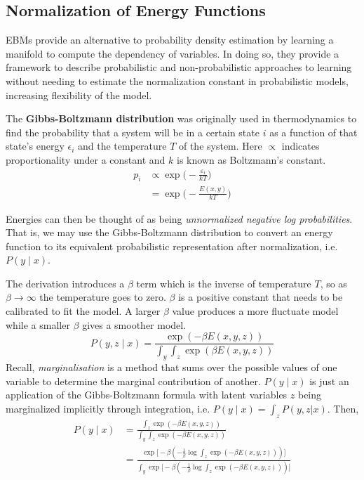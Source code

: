 \documentclass{article}
\begin{document}
\subsection{Normalization of Energy Functions}
EBMs provide an alternative to probability density estimation by learning a manifold to compute the dependency of variables. In doing so, they provide a framework to describe probabilistic and non-probabilistic approaches to learning without needing to estimate the normalization constant in probabilistic models, increasing flexibility of the model.

The \textbf{Gibbs-Boltzmann distribution} was originally used in thermodynamics to find the probability that a system will be in a certain state $i$ as a function of that state's energy $\epsilon_i$ and the temperature $T$ of the system. Here $\propto$ indicates proportionality under a constant and $k$ is known as Boltzmann's constant.  
\begin{align*}
    p_{i} &\propto \exp \bigg ( -{\frac {\varepsilon_{i}}{kT}} \bigg )\\
     &= \exp \bigg( - \frac{E(x, y)}{kT} \bigg )
\end{align*}

Energies can then be thought of as being \textit{unnormalized negative log probabilities}. That is, we may use the Gibbs-Boltzmann distribution to convert an energy function to its equivalent probabilistic representation after normalization, i.e. $P(y \mid x)$. 

The derivation introduces a $\beta$ term which is the inverse of temperature $T$, so as $\beta \rightarrow \infty$ the temperature goes to zero. $\beta$ is a positive constant that needs to be calibrated to fit the model. A larger $\beta$ value produces a more fluctuate model while a smaller $\beta$ gives a smoother model. 
\[
    P(y, z \mid x) = \frac{\exp(-\beta E(x,y,z)) }{ \int_y \int_z \exp(\beta E(x, y, z))} 
\]
Recall, \textit{marginalisation} is a method that sums over the possible values of one variable to determine the marginal contribution of another. $P(y \mid x)$ is just an application of the Gibbs-Boltzmann formula with latent variables $z$ being marginalized implicitly through integration, i.e. $P(y \mid x) = \int_z P(y,z | x)$. Then,
\begin{align*}
    P(y \mid x) &= \frac{ \int_z \exp(-\beta E(x,y,z)) }{ \int_y \int_z \exp(-\beta E(x, y, z))} \\
    &= \frac{
        \exp \bigg [  -\beta (-\frac{1}{\beta} \log  \int_z \exp(-\beta E(x,y,z)) ) \bigg ]
    }{
        \int_y \exp \bigg [  -\beta (-\frac{1}{\beta} \log  \int_z \exp(-\beta E(x,y,z)) ) \bigg ]
    }
\end{align*}
\end{document}
